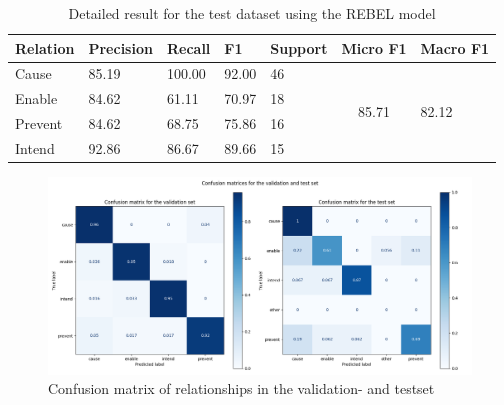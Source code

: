 \documentclass[
hf, %
]{ceurart}
\begin{document}
\begin{table}[!h]
	\centering
	\begin{tabular}{|l|l|l|l|l|c|l|}
		\hline
		\textbf{Relation} & \textbf{Precision} & \textbf{Recall} & \textbf{F1} & \textbf{Support} & \multicolumn{1}{l|}{\textbf{Micro F1}} & \textbf{Macro F1}      \\ \hline
		Cause             & 85.19              & 100.00          & 92.00       & 46               & \multirow{4}{*}{85.71}                 & \multirow{4}{*}{82.12} \\ \cline{1-5}
		Enable            & 84.62              & 61.11           & 70.97       & 18               &                                        &                        \\ \cline{1-5}
		Prevent           & 84.62              & 68.75           & 75.86       & 16               &                                        &                        \\ \cline{1-5}
		Intend            & 92.86              & 86.67           & 89.66       & 15               &                                        &                        \\ \hline
	\end{tabular}
	\caption{Detailed result for the test dataset using the REBEL model}
	\label{apx:test_result_rebel}
\end{table}

\begin{figure}[!h]
	\centering
	\includegraphics[width=1.2\textwidth]{Images/Confusion_matrix.png}
	\caption{Confusion matrix of relationships in the validation- and testset}
	\label{fig:confusion_matrix}
\end{figure}
\end{document}
